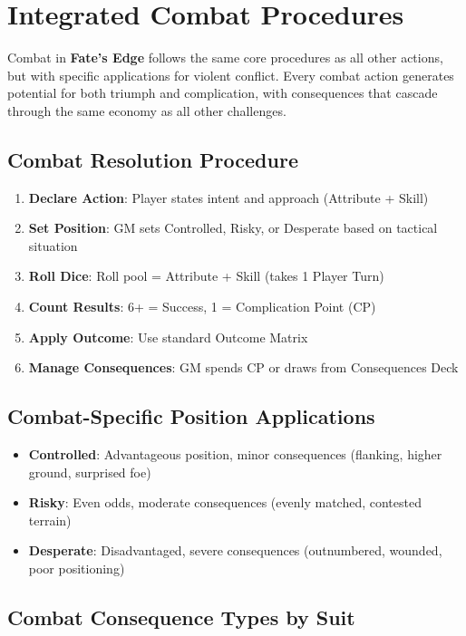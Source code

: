\section{Integrated Combat Procedures}

Combat in \textbf{Fate's Edge} follows the same core procedures as all other actions, but with specific applications for violent conflict. Every combat action generates potential for both triumph and complication, with consequences that cascade through the same economy as all other challenges.

\subsection{Combat Resolution Procedure}

\begin{enumerate}
    \item \textbf{Declare Action}: Player states intent and approach (Attribute + Skill)
    \item \textbf{Set Position}: GM sets Controlled, Risky, or Desperate based on tactical situation
    \item \textbf{Roll Dice}: Roll pool = Attribute + Skill (takes 1 Player Turn)
    \item \textbf{Count Results}: 6+ = Success, 1 = Complication Point (CP)
    \item \textbf{Apply Outcome}: Use standard Outcome Matrix
    \item \textbf{Manage Consequences}: GM spends CP or draws from Consequences Deck
\end{enumerate}

\subsection{Combat-Specific Position Applications}

\begin{itemize}
    \item \textbf{Controlled}: Advantageous position, minor consequences (flanking, higher ground, surprised foe)
    \item \textbf{Risky}: Even odds, moderate consequences (evenly matched, contested terrain)
    \item \textbf{Desperate}: Disadvantaged, severe consequences (outnumbered, wounded, poor positioning)
\end{itemize}

\subsection{Combat Consequence Types by Suit}


